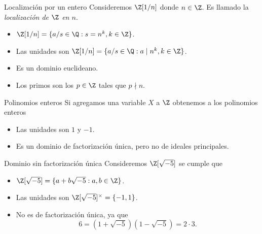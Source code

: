 \begin{frame}{Localización por un entero}
  Consideremos $\Z[1/n]$ donde $n \in \Z$. Es llamado la \emph{localización de $\Z$ en $n$}.

  \pause\bigskip
  \begin{itemize}[<+->]
    \item $\Z[1/n] = \{a/s \in \Q : s = n^k, k \in\Z \}$.
    \bigskip

    \item Las unidades son $\Z[1/n] = \{a/s \in \Q : a \mid n^k, k \in\Z \}$.
    \bigskip

    \item Es un dominio euclideano.
    \bigskip
    
    \item Los primos son los $p \in \Z$ tales que $p \nmid n$.
  \end{itemize}
\end{frame}



\begin{frame}{Polinomios enteros}
  Si agregamos una variable $X$ a $\Z$ obtenemos a los polinomios enteros

  \pause\bigskip
  \begin{itemize}[<+->]
    \item Las unidades son $1$ y $-1$.
    \bigskip

    \item Es un dominio de factorización única, pero no de ideales principales.
  \end{itemize}
\end{frame}


\begin{frame}{Dominio sin factorización única}
  Consideremos $\Z[\sqrt{-5}]$ se cumple que

  \pause\bigskip
  \begin{itemize}[<+->]
    \item $\Z[\sqrt{-5}] = \{a + b\sqrt{-5} : a,b \in \Z\}$.
    \bigskip

    \item Las unidades son $\Z[\sqrt{-5}]^\times = \{-1, 1\}$.
    \bigskip

    \item No es de factorización única, ya que
      \[
        6 = (1+\sqrt{-5})(1-\sqrt{-5}) = 2 \cdot 3.
      \]
  \end{itemize}
\end{frame}


